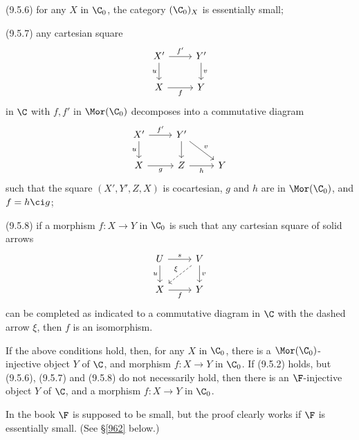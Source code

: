 \documentclass[12pt]{article}
\theoremstyle{remark}
\theoremstyle{definition}
\begin{document}
\nn(9.5.6) for any $X$ in $\C_0$, the category $(\C_0)_X$ is essentially small;

\nn(9.5.7) any cartesian square 
$$
\begin{tikzcd}
X'\ar{d}[swap]{u}\ar{r}{f'}&Y'\ar{d}{v}\\ 
X\ar{r}[swap]{f}&Y
\end{tikzcd}
$$ 
in $\C$ with $f,f'$ in $\Mor(\C_0)$ decomposes into a commutative diagram 
$$
\begin{tikzcd}
X'\ar{d}[swap]{u}\ar{r}{f'}&Y'\ar{d}\ar{rd}{v}\\ 
X\ar{r}[swap]{g}&Z\ar{r}[swap]{h}&Y
\end{tikzcd}
$$ 
such that the square $(X',Y',Z,X)$ is cocartesian, $g$ and $h$ are in $\Mor(\C_0)$, and $f=h\ci g$; 

\nn(9.5.8) if a morphism $f:X\to Y$ in $\C_0$ is such that any cartesian square of solid arrows
$$
\begin{tikzcd}
U\ar{d}[swap]{u}\ar{r}{s}&V\ar{d}{v}\ar[dashed]{ld}[swap]{\xi}\\ 
X\ar{r}[swap]{f}&Y
\end{tikzcd}
$$ 
can be completed as indicated to a commutative diagram in $\C$ with the dashed arrow $\xi$, then $f$ is an isomorphism. 
\begin{thm} 
If the above conditions hold, then, for any $X$ in $\C_0$, there is a $\Mor(\C_0)$-injective object $Y$ of $\C$, and morphism $f:X\to Y$ in $\C_0$. If (9.5.2) holds, but (9.5.6), (9.5.7) and (9.5.8) do not necessarily hold, then there is an $\F$-injective object $Y$ of $\C$, and a morphism $f:X\to Y$ in $\C_0$.
\end{thm}
\begin{rk}
In the book $\F$ is supposed to be small, but the proof clearly works if $\F$ is essentially small. (See \S\ref{962} below.)
\end{rk}


\end{document}
